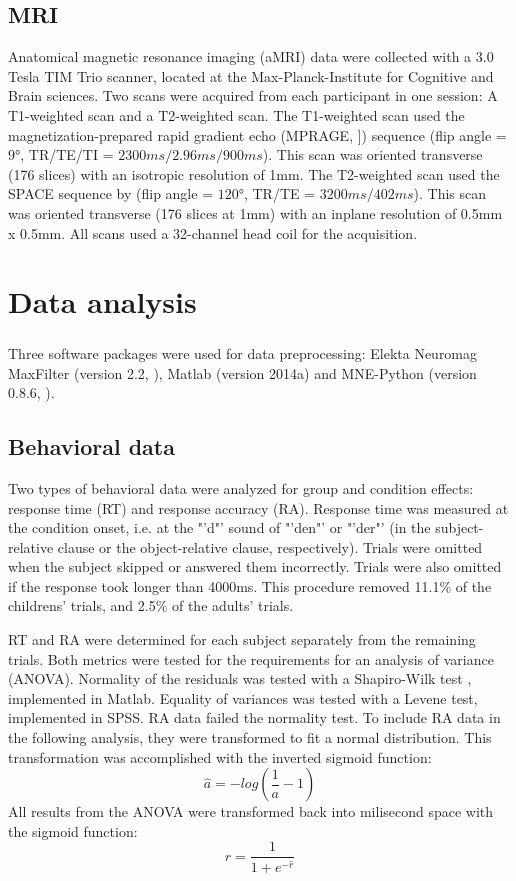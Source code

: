 \subsection {MRI}
Anatomical magnetic resonance imaging (aMRI) data were collected with a 3.0 Tesla TIM Trio scanner, located at the Max-Planck-Institute for Cognitive and Brain sciences.
Two scans were acquired from each participant in one session: A T1-weighted scan and a T2-weighted scan.
The T1-weighted scan used the magnetization-prepared rapid gradient echo (MPRAGE, \cite{3.2.mprage}]) sequence (flip angle = $9\si{\degree}$, TR/TE/TI = $2300ms/2.96ms/900ms$).
This scan was oriented transverse (176 slices) with an isotropic resolution of 1mm.
The T2-weighted scan used the SPACE sequence by \cite{3.2.space} (flip angle = $120\si{\degree}$, TR/TE = $3200ms/402ms$).
This scan was oriented transverse (176 slices at 1mm) with an inplane resolution of 0.5mm x 0.5mm.
All scans used a 32-channel head coil for the acquisition.


\section{Data analysis}

Three software packages were used for data preprocessing: Elekta Neuromag\textsuperscript{\textregistered} MaxFilter (version 2.2, \cite{3.3.MNE}), Matlab (version 2014a) and MNE-Python (version 0.8.6, \cite{3.3.MNEpython}).

\subsection{Behavioral data}

Two types of behavioral data were analyzed for group and condition effects: response time (RT) and response accuracy (RA).
Response time was measured at the condition onset, i.e. at the "'d"' sound of "'den"' or "'der"' (in the subject-relative clause or the object-relative clause, respectively).
Trials were omitted when the subject skipped or answered them incorrectly.
Trials were also omitted if the response took longer than 4000ms.
This procedure removed 11.1\% of the childrens' trials, and 2.5\% of the adults' trials.

RT and RA were determined for each subject separately from the remaining trials.
Both metrics were tested for the requirements for an analysis of variance (ANOVA).
Normality of the residuals was tested with a Shapiro-Wilk test \cite{3.3.swtest}, implemented in Matlab.
Equality of variances was tested with a Levene test\cite{3.3.levtest}, implemented in SPSS.
RA data failed the normality test.
To include RA data in the following analysis, they were transformed to fit a normal distribution.
This transformation was accomplished with the inverted sigmoid function:
\[ \hat{a} = - log( \frac{1}{a} - 1 ) \]
All results from the ANOVA were transformed back into milisecond space with the sigmoid function:
\[ r = \frac{1}{1+e^{-\hat{r}}} \]

